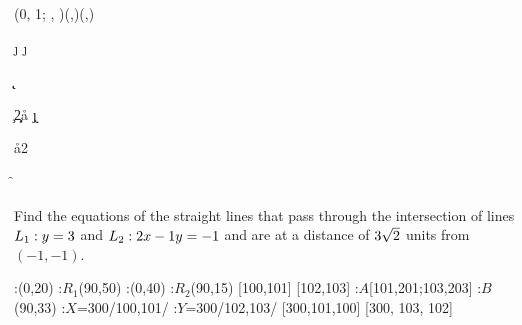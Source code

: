 



\MULTIPLY{}\a
\SOLVELINEARSYSTEM(0, 1; \vb, \vc)(\va,\vd)(\p,\q)

\ADD{}\j
\SQUARE\j\jj

\ADD{}\k
\SQUARE\k\kk

\SQUARE\ve\c
\MULTIPLY\c{2}\d

\SUBTRACT\d\jj\aa
\MULTIPLY\j\k\x
\MULTIPLY{}\bb
\SUBTRACT\d\kk\cc

\gcalcexpr[0]
\MULTIPLY{}\mbb
\MULTIPLY\aa{2}\dnm

\ADD\mbb\disc\f
\SUBTRACT\mbb\disc\g


\question[4] Find the equations of the straight lines that pass
 through the intersection of lines $L_1: y=3$ and 
 $L_2: 2 x -1 y = -1$ and are at a distance of $3\sqrt{2}$
 units from $(-1, -1)$.

\watchout

\ifprintanswers
  \vspace{0.7cm}
    :(0,20)
    :$R_1$(90,50)
    :(0,40)
    :$R_2$(90,15)
    [100,101]
    [102,103]
    :$A$[101,201;103,203] %
    :$B$ (90,33)
    :$X$=300/100,101/
    :$Y$=300/102,103/
  \figdrawbegin{}
    \figdrawline [100,101]
    \figdrawline [102,103]
     [300,101,100]
     [300, 103, 102]
  \figdrawend
  \centerline{\box\figBoxA}
\fi 

